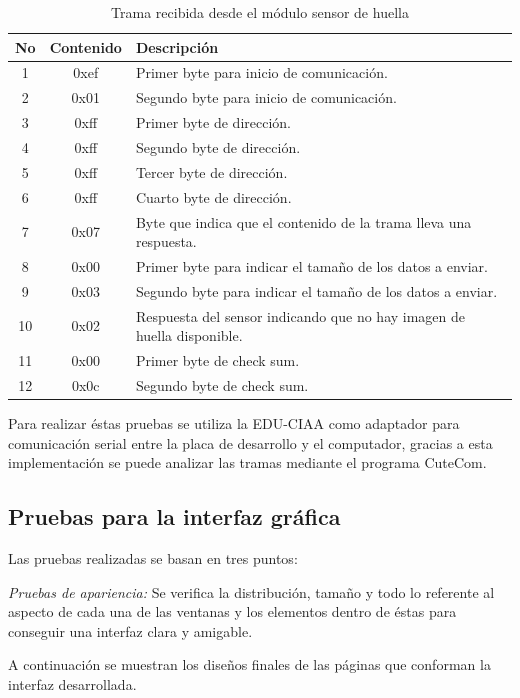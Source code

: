 \begin{table}[h]
	\centering
	\caption[Resultado de la trama recibida]{Trama recibida desde el módulo sensor de huella}
	\begin{tabular}{c c l}    
		\toprule
		\textbf{No}  & \textbf{Contenido}  & \textbf{Descripción}\\
		\midrule
		1	 	& 0xef 	& Primer byte para inicio de comunicación.\\		
		2	 	& 0x01 	& Segundo byte para inicio de comunicación.\\
		3 		& 0xff & Primer byte de dirección.\\	
		4	 	& 0xff 	& Segundo byte de dirección.\\
		5	 	& 0xff 	& Tercer byte de dirección.\\
		6	 	& 0xff 	& Cuarto byte de dirección.\\
		7	 	& 0x07 	& Byte que indica que el contenido de la trama lleva una respuesta.\\
		8	 	& 0x00 	& Primer byte para indicar el tamaño de los datos a enviar.\\				
		9	 	& 0x03 	& Segundo byte para indicar el tamaño de los datos a enviar.\\	
		10	 	& 0x02 	& Respuesta del sensor indicando que no hay imagen de huella disponible.\\	
		11	 	& 0x00 	& Primer byte de check sum.\\	
		12	 	& 0x0c 	& Segundo byte de check sum.\\				
		\bottomrule
		\hline
	\end{tabular}
	\label{tab:tramarecibida}
\end{table}


Para realizar éstas pruebas se utiliza la EDU-CIAA como adaptador para comunicación serial entre la placa de desarrollo y el computador, gracias a esta implementación se puede analizar las tramas mediante el programa CuteCom.

\subsection{Pruebas para la interfaz gráfica}
Las pruebas realizadas se basan en tres puntos:

\textit{Pruebas de apariencia:} Se verifica la distribución, tamaño y todo lo referente al aspecto de cada una de las ventanas y los elementos dentro de éstas para conseguir una interfaz clara y amigable.

A continuación se muestran los diseños finales de las páginas que conforman la interfaz desarrollada.

